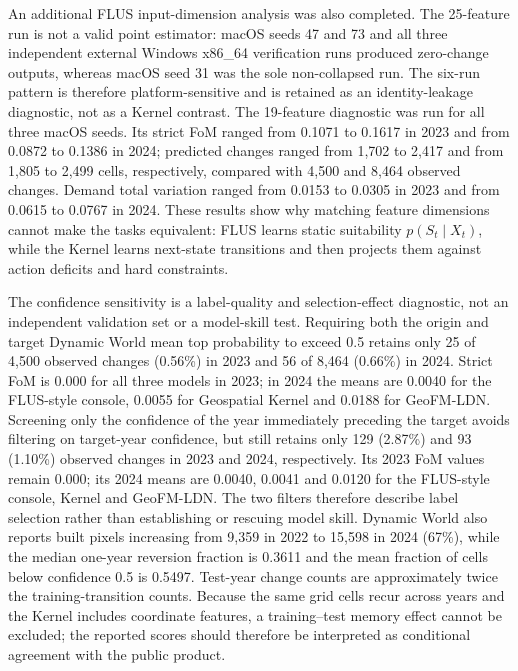 An additional FLUS input-dimension analysis was also completed. The
25-feature run is not a valid point estimator: macOS seeds 47 and 73 and
all three independent external Windows x86\_64 verification runs
produced zero-change outputs, whereas macOS seed 31 was the sole
non-collapsed run. The six-run pattern is therefore platform-sensitive
and is retained as an identity-leakage diagnostic, not as a Kernel
contrast. The 19-feature diagnostic was run for all three macOS seeds.
Its strict FoM ranged from 0.1071 to 0.1617 in 2023 and from 0.0872 to
0.1386 in 2024; predicted changes ranged from 1,702 to 2,417 and from
1,805 to 2,499 cells, respectively, compared with 4,500 and 8,464
observed changes. Demand total variation ranged from 0.0153 to 0.0305 in
2023 and from 0.0615 to 0.0767 in 2024. These results show why matching
feature dimensions cannot make the tasks equivalent: FLUS learns static
suitability \(p(S_t\mid X_t)\), while the Kernel learns next-state
transitions and then projects them against action deficits and hard
constraints.

The confidence sensitivity is a label-quality and selection-effect
diagnostic, not an independent validation set or a model-skill test.
Requiring both the origin and target Dynamic World mean top probability
to exceed 0.5 retains only 25 of 4,500 observed changes (0.56\%) in 2023
and 56 of 8,464 (0.66\%) in 2024. Strict FoM is 0.000 for all three
models in 2023; in 2024 the means are 0.0040 for the FLUS-style console,
0.0055 for Geospatial Kernel and 0.0188 for GeoFM-LDN. Screening only
the confidence of the year immediately preceding the target avoids
filtering on target-year confidence, but still retains only 129 (2.87\%)
and 93 (1.10\%) observed changes in 2023 and 2024, respectively. Its
2023 FoM values remain 0.000; its 2024 means are 0.0040, 0.0041 and
0.0120 for the FLUS-style console, Kernel and GeoFM-LDN. The two filters
therefore describe label selection rather than establishing or rescuing
model skill. Dynamic World also reports built pixels increasing from
9,359 in 2022 to 15,598 in 2024 (67\%), while the median one-year
reversion fraction is 0.3611 and the mean fraction of cells below
confidence 0.5 is 0.5497. Test-year change counts are approximately
twice the training-transition counts. Because the same grid cells recur
across years and the Kernel includes coordinate features, a
training--test memory effect cannot be excluded; the reported scores
should therefore be interpreted as conditional agreement with the public
product.

